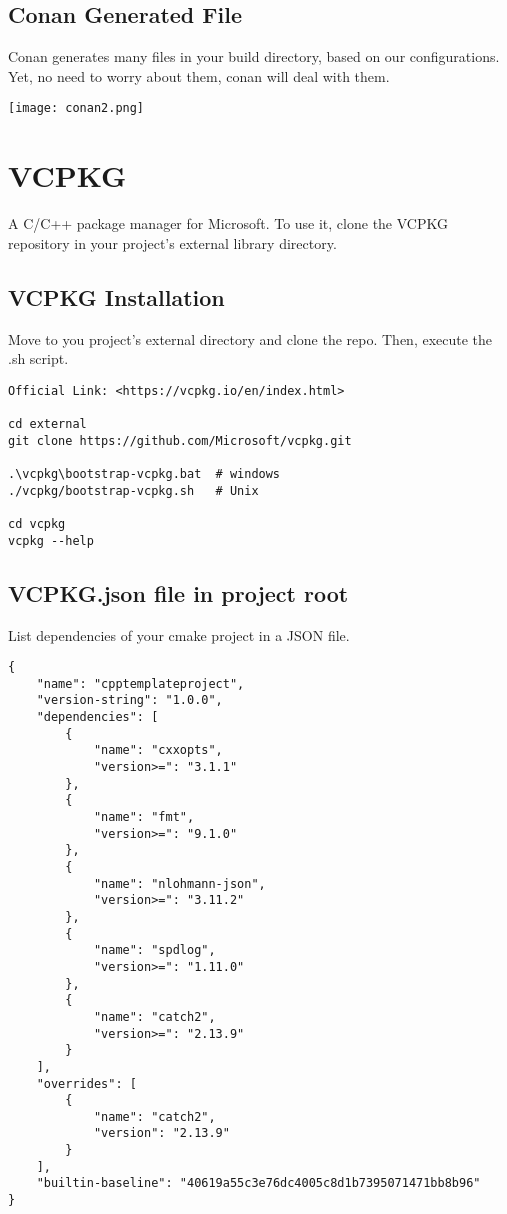 \subsection{Conan Generated File}

Conan generates many files in your build directory, based on our configurations. Yet, no need to worry about them, conan
will deal with them.


\begin{center}
    \texttt{[image: conan2.png]}
\end{center}

\section{VCPKG}

A C/C++ package manager for Microsoft. 
To use it, clone the VCPKG repository in your project's external library directory.


\subsection{VCPKG Installation}

Move to you project's external directory and clone the repo. Then, execute the .sh script.
 
\begin{verbatim}
Official Link: <https://vcpkg.io/en/index.html>

cd external
git clone https://github.com/Microsoft/vcpkg.git

.\vcpkg\bootstrap-vcpkg.bat  # windows
./vcpkg/bootstrap-vcpkg.sh   # Unix

cd vcpkg 
vcpkg --help 
\end{verbatim}


\subsection{VCPKG.json file in project root}

List dependencies of your cmake project in a JSON file.

\begin{verbatim}
{
    "name": "cpptemplateproject",
    "version-string": "1.0.0",
    "dependencies": [
        {
            "name": "cxxopts",
            "version>=": "3.1.1"
        },
        {
            "name": "fmt",
            "version>=": "9.1.0"
        },
        {
            "name": "nlohmann-json",
            "version>=": "3.11.2"
        },
        {
            "name": "spdlog",
            "version>=": "1.11.0"
        },
        {
            "name": "catch2",
            "version>=": "2.13.9"
        }
    ],
    "overrides": [
        {
            "name": "catch2",
            "version": "2.13.9"
        }
    ],
    "builtin-baseline": "40619a55c3e76dc4005c8d1b7395071471bb8b96"
}
\end{verbatim}



